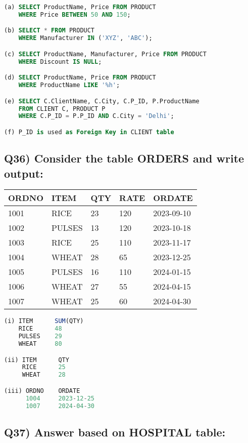 \documentclass{article}
\begin{document}
\begin{lstlisting}[language=SQL]
(a) SELECT ProductName, Price FROM PRODUCT 
    WHERE Price BETWEEN 50 AND 150;

(b) SELECT * FROM PRODUCT 
    WHERE Manufacturer IN ('XYZ', 'ABC');

(c) SELECT ProductName, Manufacturer, Price FROM PRODUCT 
    WHERE Discount IS NULL;

(d) SELECT ProductName, Price FROM PRODUCT 
    WHERE ProductName LIKE '%h';

(e) SELECT C.ClientName, C.City, C.P_ID, P.ProductName 
    FROM CLIENT C, PRODUCT P 
    WHERE C.P_ID = P.P_ID AND C.City = 'Delhi';

(f) P_ID is used as Foreign Key in CLIENT table
\end{lstlisting}

\subsection*{Q36) Consider the table ORDERS and write output:}

\begin{tabular}{|l|l|l|l|l|}
\hline
ORDNO & ITEM & QTY & RATE & ORDATE \\
\hline
1001 & RICE & 23 & 120 & 2023-09-10 \\
1002 & PULSES & 13 & 120 & 2023-10-18 \\
1003 & RICE & 25 & 110 & 2023-11-17 \\
1004 & WHEAT & 28 & 65 & 2023-12-25 \\
1005 & PULSES & 16 & 110 & 2024-01-15 \\
1006 & WHEAT & 27 & 55 & 2024-04-15 \\
1007 & WHEAT & 25 & 60 & 2024-04-30 \\
\hline
\end{tabular}

\begin{lstlisting}[language=SQL]
(i) ITEM      SUM(QTY)
    RICE      48
    PULSES    29
    WHEAT     80

(ii) ITEM      QTY
     RICE      25
     WHEAT     28

(iii) ORDNO    ORDATE
      1004     2023-12-25
      1007     2024-04-30
\end{lstlisting}

\subsection*{Q37) Answer based on HOSPITAL table:}
\end{document}
